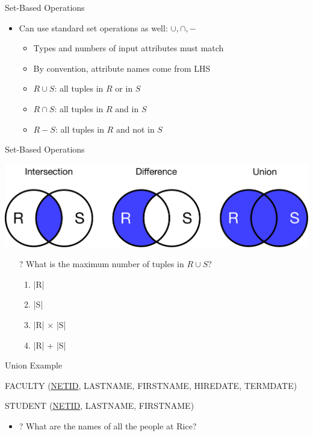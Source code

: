 \documentclass[aspectratio=169]{beamer}
\newenvironment{noindentitemize}
{ \begin{itemize}
 \setlength{\itemsep}{1.5ex}
  \setlength{\parsep}{0pt}   
  \setlength{\parskip}{0pt}
 \addtolength{\leftskip}{-2em}
 }
{ \end{itemize} }
\newenvironment{noindentitemize2}
{ \begin{itemize}
  \setlength{\itemsep}{0ex}
  \setlength{\parskip}{0pt}
  \setlength{\parsep}{0pt}   
  \addtolength{\leftskip}{-2em}  }
{ \end{itemize} }
\begin{document}
\begin{frame}{Set-Based Operations}

\begin{noindentitemize}
\item Can use standard set operations as well: $\cup, \cap, -$
	\begin{noindentitemize2}
	\item Types and numbers of input attributes must match
	\item By convention, attribute names come from LHS %
	\item $R \cup S$: all tuples in $R$ or in $S$
	\item $R \cap S$: all tuples in $R$ and in $S$
	\item $R - S$: all tuples in $R$ and not in $S$
	\end{noindentitemize2}
\end{noindentitemize}
\end{frame}


\begin{frame}{Set-Based Operations}

{\centering\includegraphics[width=1\textwidth]{./lectRCRA/setOps.pdf}}
\begin{itemize}
\item[?] What is the maximum number of tuples in $R \cup S$?
\begin{enumerate}[A]
\item |R|
\item  |S|
\item |R| $\times$ |S|
\item |R| + |S| %
\end{enumerate}
\end{itemize}

\end{frame}


\begin{frame}{Union Example}

FACULTY (\underline{NETID}, LASTNAME, FIRSTNAME, HIREDATE, TERMDATE)

STUDENT (\underline{NETID}, LASTNAME, FIRSTNAME)

\begin{noindentitemize}
\item[?] What are the names of all the people at Rice?
\end{noindentitemize}
\end{frame}
\end{document}

